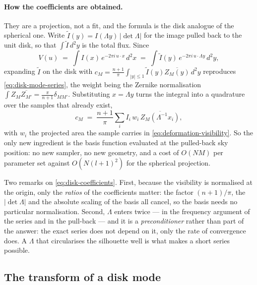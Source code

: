 \paragraph{How the coefficients are obtained.}  They are a projection, not a fit, and the
formula is the disk analogue of the spherical one.  Write $\tilde I(y) = I(\Lambda
y)\,|\det\Lambda|$ for the image pulled back to the unit disk, so that $\int\tilde
I\,d^2y$ is the total flux.  Since
\begin{equation}
  V(u) \;=\; \int I(x)\,e^{-2\pi i\,u\cdot x}\,d^2x
         \;=\; \int \tilde I(y)\,e^{-2\pi i\,u\cdot\Lambda y}\,d^2y ,
  \label{eq:disk-pullback}
\end{equation}
expanding $\tilde I$ on the disk with
$c_M = \frac{n+1}{\pi}\int_{|y|\le1}\tilde I(y)\overline{Z_M(y)}\,d^2y$ reproduces
\eqref{eq:disk-mode-series}, the weight being the Zernike normalisation
$\int Z_M\overline{Z_{M'}} = \frac{\pi}{n+1}\delta_{MM'}$.  Substituting $x = \Lambda y$
turns the integral into a quadrature over the samples that already exist,
\begin{equation}
  c_M \;=\; \frac{n+1}{\pi}\sum_i I_i\,w_i\,\overline{Z_M\!\left(\Lambda^{-1}x_i\right)} ,
  \label{eq:disk-coefficients}
\end{equation}
with $w_i$ the projected area the sample carries in
\eqref{eq:deformation-visibility}.  So the only new ingredient is the basis function
evaluated at the pulled-back sky position: no new sampler, no new geometry, and a cost of
$O(NM)$ per parameter set against $O(N(l+1)^2)$ for the spherical projection.

Two remarks on \eqref{eq:disk-coefficients}.  First, because the visibility is normalised at
the origin, only the \emph{ratios} of the coefficients matter: the factor $(n+1)/\pi$, the
$|\det\Lambda|$ and the absolute scaling of the basis all cancel, so the basis needs no
particular normalisation.  Second, $\Lambda$ enters twice --- in the frequency argument of
the series and in the pull-back --- and it is a \emph{preconditioner} rather than part of the
answer: the exact series does not depend on it, only the rate of convergence does.  A
$\Lambda$ that circularises the silhouette well is what makes a short series possible.

\subsection{The transform of a disk mode}
\label{sec:disk-modes-transform}

